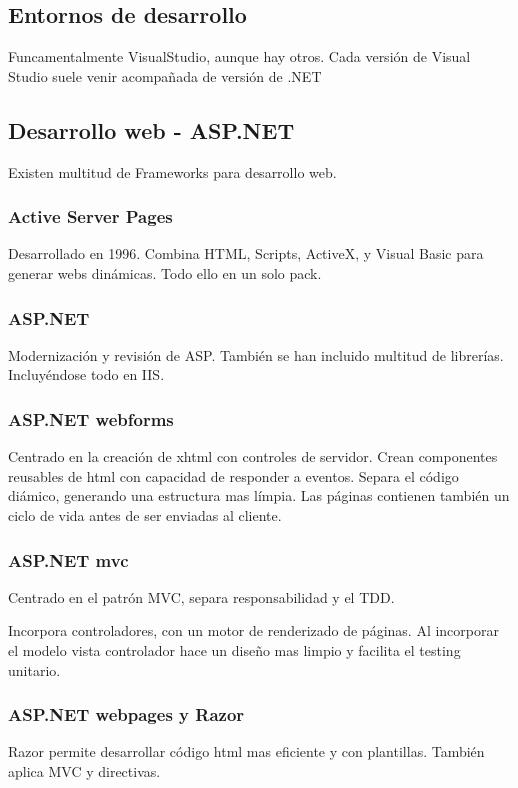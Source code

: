 \subsection{Entornos de desarrollo}
    Funcamentalmente VisualStudio, aunque hay otros. Cada versión de Visual Studio suele venir acompañada de versión de .NET

\subsection{Desarrollo web - ASP.NET}
Existen multitud de Frameworks para desarrollo web.

    \subsubsection{Active Server Pages}
        Desarrollado en 1996. Combina HTML, Scripts, ActiveX, y Visual Basic para generar webs dinámicas. Todo ello en un solo pack.

    \subsubsection{ASP.NET}
        Modernización y revisión de ASP. También se han incluido multitud de librerías. Incluyéndose todo en IIS.

    \subsubsection{ASP.NET webforms}
        Centrado en la creación de xhtml con controles de servidor. Crean componentes reusables de html con capacidad de responder a eventos. Separa el código diámico, generando una estructura mas límpia. Las páginas contienen también un ciclo de vida antes de ser enviadas al cliente.

    \subsubsection{ASP.NET mvc}
        Centrado en el patrón MVC, separa responsabilidad y el TDD.

        Incorpora controladores, con un motor de renderizado de páginas. Al incorporar el modelo vista controlador hace un diseño mas limpio y facilita el testing unitario.

    \subsubsection{ASP.NET webpages y Razor}
        Razor permite desarrollar código html mas eficiente y con plantillas. También aplica MVC y directivas.

